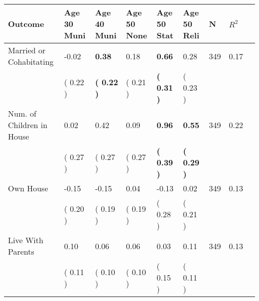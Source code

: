 \begin{tabular}{L{6.2cm} C{1.8cm} C{1.8cm} C{1.8cm} C{1.8cm} C{1.8cm} C{1.8cm} C{0.3cm} C{0.3cm}}
\toprule
 \textbf{Outcome} & \textbf{Age 30 Muni} & \textbf{Age 40 Muni} & \textbf{Age 50 None} & \textbf{Age 50 Stat} & \textbf{Age 50 Reli} & \textbf{N} & \textbf{$ R^2$} \\
\midrule
Married or Cohabitating &     -0.02 & \textbf{     0.38} &      0.18 & \textbf{     0.66} &      0.28  & 349 &       0.17 \\ 
 & (     0.22 ) & \textbf{(     0.22 )} & (     0.21 ) & \textbf{(     0.31 )} & (     0.23 )  & \\
Num. of Children in House &      0.02 &      0.42 &      0.09 & \textbf{     0.96} & \textbf{     0.55}  & 349 &       0.22 \\ 
 & (     0.27 ) & (     0.27 ) & (     0.27 ) & \textbf{(     0.39 )} & \textbf{(     0.29 )}  & \\
Own House &     -0.15 &     -0.15 &      0.04 &     -0.13 &      0.02  & 349 &       0.13 \\ 
 & (     0.20 ) & (     0.19 ) & (     0.19 ) & (     0.28 ) & (     0.21 )  & \\
Live With Parents &      0.10 &      0.06 &      0.06 &      0.03 &      0.11  & 349 &       0.13 \\ 
 & (     0.11 ) & (     0.10 ) & (     0.10 ) & (     0.15 ) & (     0.11 )  & \\
\bottomrule
\end{tabular}
